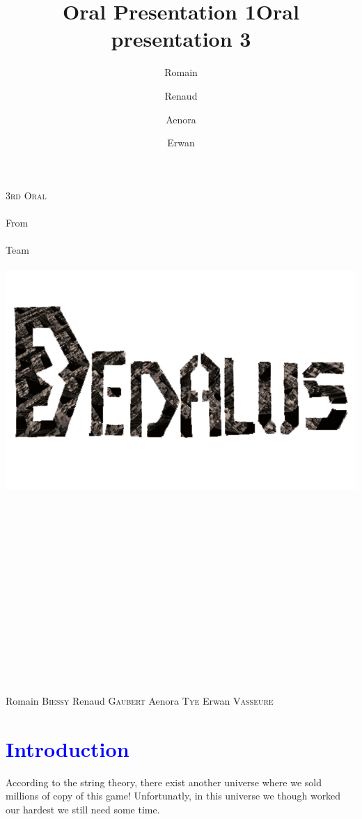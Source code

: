 \documentclass[article]{report}             %
\title {Oral Presentation 1}
\title {Oral presentation 3}
\author {Romain\and Renaud\and Aenora\and Erwan}
\date {}
\begin{document}
	\thispagestyle{empty}
  	\begin{titlepage} 
		\vspace*{1cm} 
  		\begin{center} 
  			{\huge{\textsc{3rd Oral} \\ ~ \\{\large From}\\ ~\\ Team \\  ~ \\ }}
	  		\includegraphics[width = 14cm]{images/Titles/Dedalus.png}
			\\ ~ \\ ~ \\ ~ \\ ~ \\ ~ \\ ~ \\ ~ \\ ~ \\ ~ \\ ~ \\ ~ \\ ~ \\ ~ \\ ~ 
		\end{center}
  		\hfill {\large Romain \textsc{Biessy}}
  		\hfill {\large Renaud \textsc{Gaubert}}
  		\hfill {\large Aenora \textsc{Tye}}
  		\hfill {\large Erwan  \textsc{Vasseure}}
  	\end{titlepage} 

  	\tableofcontents
  		\newpage
		
		\chapter{\textcolor{blue}{Introduction}}
			According to the string theory, there exist another universe where we sold millions of copy of this game! Unfortunatly, in this universe we though worked our hardest we still need some time.\\
\end{document}
